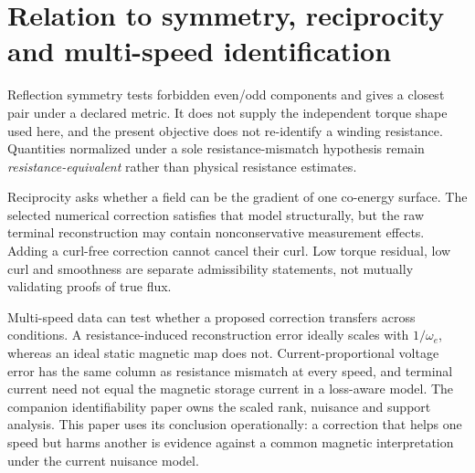 \section{Relation to symmetry, reciprocity and multi-speed identification}
Reflection symmetry tests forbidden even/odd components and gives a closest
pair under a declared metric. It does not supply the independent torque shape
used here, and the present objective does not re-identify a winding resistance.
Quantities normalized under a sole resistance-mismatch hypothesis remain
\emph{resistance-equivalent} rather than physical resistance estimates.

Reciprocity asks whether a field can be the gradient of one co-energy surface.
The selected numerical correction satisfies that model structurally, but the
raw terminal reconstruction may contain nonconservative measurement effects.
Adding a curl-free correction cannot cancel their curl. Low torque residual,
low curl and smoothness are separate admissibility statements, not mutually
validating proofs of true flux.

Multi-speed data can test whether a proposed correction transfers across
conditions. A resistance-induced reconstruction error ideally scales with
$1/\omega_e$, whereas an ideal static magnetic map does not. Current-proportional
voltage error has the same column as resistance mismatch at every speed, and
terminal current need not equal the magnetic storage current in a loss-aware
model. The companion identifiability paper owns the scaled rank, nuisance and
support analysis. This paper uses its conclusion operationally: a correction
that helps one speed but harms another is evidence against a common magnetic
interpretation under the current nuisance model.
